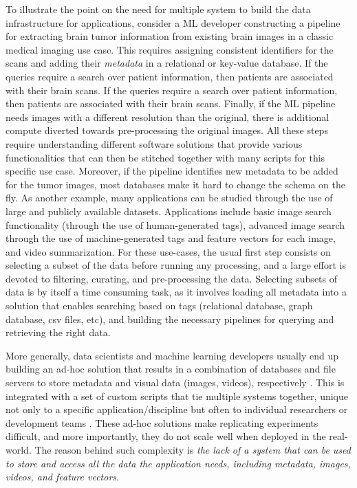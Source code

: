 To illustrate the point on the need for multiple system to build the data
infrastructure for applications,
consider a ML developer constructing a pipeline for extracting
brain tumor information from existing brain images in a classic medical
imaging use case.
This requires assigning consistent identifiers for the scans and adding their
\textit{metadata} in a relational or key-value database\cite{kumar2017data}.
If the queries require a search over patient information,
then patients are associated with their brain scans.
If the queries require a search over patient information,
then patients are associated with their brain scans.
Finally, if the ML pipeline needs images with a different resolution
than the original, there is additional compute
diverted towards pre-processing the original images.
All these steps require understanding different software
solutions that provide various functionalities that can then be stitched
together with many scripts for this specific use case.
Moreover, if the pipeline identifies new metadata to be added for
the tumor images, most databases make it hard to change the schema on the fly.
As another example, many applications can be studied through the use of large
and publicly available datasets.
Applications include basic image search functionality (through the use
of human-generated tags), advanced image search through the use of
machine-generated tags and feature vectors\cite{imagesearch, qin2020similarity}
for each image, and video summarization.
For these use-cases, the usual first step consists on selecting a
subset of the data before running any processing, and a large effort
is devoted to filtering, curating, and pre-processing the data.
Selecting subsets of data is by itself a time consuming task,
as it involves loading all metadata into a solution that enables searching
based on tags (relational database, graph database, csv files, etc), and
building the necessary pipelines for querying and retrieving the right data.

More generally, data scientists and machine learning developers
usually end up building an ad-hoc solution that results in a
combination of databases and file servers to store
metadata and visual data (images, videos), respectively \cite{sculley2015hidden}.
This is integrated with a set of custom scripts that tie multiple systems together,
unique not only to a specific application/discipline but often
to individual researchers or development teams
\cite{mayer2020scalable, sculley2015hidden}.
These ad-hoc solutions make replicating experiments difficult,
and more importantly, they do not scale well when deployed in the real-world.
The reason behind such complexity is \textit{the lack of a system
that can be used to store and access all the data the application needs,
including metadata, images, videos, and feature vectors}.

